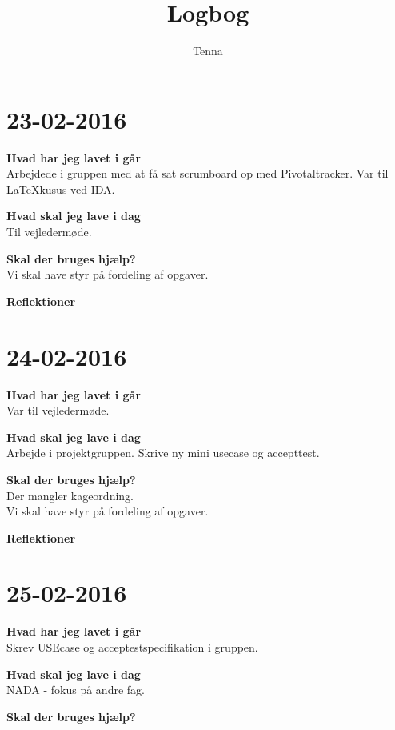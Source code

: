 \documentclass{article}
\title{Logbog}
\author{Tenna}
\date{}
\begin{document}
	\maketitle
	\tableofcontents
	
	\section{23-02-2016}
	
	\textbf{Hvad har jeg lavet i går}\\
	Arbejdede i gruppen med at få sat scrumboard op med Pivotaltracker.
	Var til LaTeXkusus ved IDA.
	
	\textbf{Hvad skal jeg lave i dag}\\
	Til vejledermøde. 
	
	\textbf{Skal der bruges hjælp?}\\
	Vi skal have styr på fordeling af opgaver.
	
	\textbf{Reflektioner}\\
	
	\section{24-02-2016}
		
	\textbf{Hvad har jeg lavet i går}\\
	Var til vejledermøde.
	
	\textbf{Hvad skal jeg lave i dag}\\
	Arbejde i projektgruppen. Skrive ny mini usecase og accepttest. 
		
	\textbf{Skal der bruges hjælp?}\\
	Der mangler kageordning.\\
	Vi skal have styr på fordeling af opgaver.
		
	\textbf{Reflektioner}\\
	
	
	\section{25-02-2016}
		
	\textbf{Hvad har jeg lavet i går}\\
	Skrev USEcase og acceptestspecifikation i gruppen.
		
	\textbf{Hvad skal jeg lave i dag}\\
	NADA - fokus på andre fag. 
		
	\textbf{Skal der bruges hjælp?}\\
	
\end{document}
